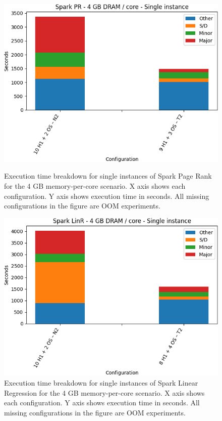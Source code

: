 \begin{figure}[thbp]
\centering
    \includegraphics[width=\linewidth]{./fig/pr32_single.png}
    \caption{ Execution time breakdown for single instances of Spark
        Page Rank for the 4 GB memory-per-core scenario. X axis shows each configuration. Y axis shows execution time in seconds. All missing configurations in the figure are OOM experiments.}
    \label{fig:pr32_single}
        \includegraphics[width=\linewidth]{./fig/linr32_single.png}
    \caption{Execution time breakdown for single instances of Spark
        Linear Regression for the 4 GB memory-per-core scenario. X axis shows each configuration. Y axis shows execution time in seconds. All missing configurations in the figure are OOM experiments.}
    \label{fig:linr32_single}
\end{figure}

